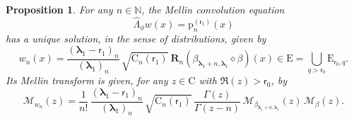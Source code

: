 \documentclass[10pt]{amsart}
\theoremstyle{plain}
\newtheorem{proposition}[theorem]{Proposition}
\theoremstyle{definition}
\newcommand{\N}{\mathbb{N}}
\newcommand{\calM}{\mathcal{M}}
\newcommand{\Rc}{\mathbf{R}}
\newcommand{\C}{{\mathrm{C}}}
\newcommand{\Em}{\mathrm{E}}
\newcommand{\pab}[1][\alpha,\beta]{\mathrm{p}^{(#1)}}
\newcommand{\lam}{{\bm{\lambda}_1}}
\newcommand{\tet}{{\mathsf{r}_0}}
\newcommand{\vat}{{\mathsf{r}_1}}
\newcommand{\gab}[1][\lam,\mo]{{\beta_{#1}}}
\let\mo\mu
\let\bpsi\beta
\begin{document}
\begin{proposition}
\label{prop:Convolution}
For any $n \in \N$, the Mellin convolution equation
\begin{equation}
\label{eq:equation_w_n1}
\widehat{\Lambda}_{\phi} w (x) = \pab[\vat]_n(x)
\end{equation}
has a unique solution, in the sense of distributions, given by
\begin{equation}
\label{eq:w_n}
w_n(x) = \frac{(\lam-\vat)_n}{(\lam)_n}\, \sqrt{\C_n(\vat)} \ \Rc_n (\gab[\lam+n,\lam] \diamond \bpsi) (x) \in \Em = \bigcup_{q>\tet}\Em_{\tet,q}.
\end{equation}
Its Mellin transform is given, for any $z \in \C$ with $\Re(z)>\tet$, by
\begin{equation}
\label{eq:Mellin_w_n}
\calM_{w_n}(z) = \frac{1}{n!}\, \frac{(\lam-\vat)_n}{(\lam)_n}\, \sqrt{\C_n(\vat)}\, \frac{\Gamma(z)}{\Gamma(z-n)}\, \calM_{\gab[\lam+n,\lam]}(z)\, \calM_\bpsi(z).
\end{equation}
\end{proposition}
\end{document}

